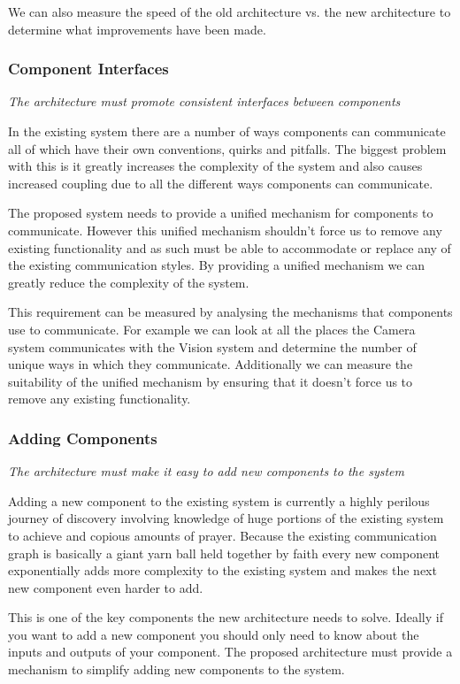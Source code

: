 \documentclass[english,12pt]{scrartcl}
\newcommand{\requirement}[1]{\textit{#1}}
\begin{document}
				We can also measure the speed of the old architecture vs. the new architecture to
				determine what improvements have been made.

			\subsubsection{Component Interfaces}
				\requirement{The architecture must promote consistent interfaces between components}
	
				In the existing system there are a number of ways components can communicate all of
				which have their own conventions, quirks and pitfalls. The biggest problem with this is
				it greatly increases the complexity of the system and also causes increased coupling due
				to all the different ways components can communicate.
	
				The proposed system needs to provide a unified mechanism for components to communicate.
				However this unified mechanism shouldn't force us to remove any existing functionality
				and as such must be able to accommodate or replace any of the existing communication
				styles. By providing a unified mechanism we can greatly reduce the complexity of the
				system.
	
				This requirement can be measured by analysing the mechanisms that components use to
				communicate. For example we can look at all the places the Camera system communicates
				with the Vision system and determine the number of unique ways in which they
				communicate. Additionally we can measure the suitability of the unified mechanism by
				ensuring that it doesn't force us to remove any existing functionality.

			\subsubsection{Adding Components}
				\requirement{The architecture must make it easy to add new components to the system}
	
				Adding a new component to the existing system is currently a highly perilous journey of
				discovery involving knowledge of huge portions of the existing system to achieve and
				copious amounts of prayer. Because the existing communication graph is basically a giant
				yarn ball held together by faith every new component exponentially adds more complexity
				to the existing system and makes the next new component even harder to add.
	
				This is one of the key components the new architecture needs to solve. Ideally if you
				want to add a new component you should only need to know about the inputs and outputs of
				your component. The proposed architecture must provide a mechanism to simplify adding
				new components to the system.
	
\end{document}
